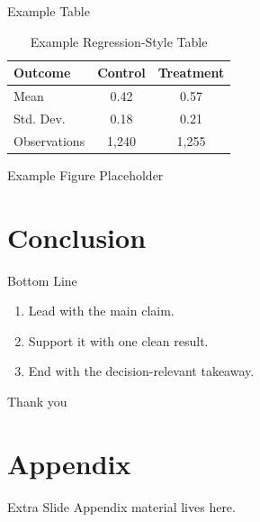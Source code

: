 \documentclass[10pt,aspectratio=169]{beamer}
\begin{document}
\begin{frame}{Example Table}
  \begin{table}
    \caption{Example Regression-Style Table}
    \begin{fittable}
      \begin{tabular}{lcc}
        \toprule
        Outcome & Control & Treatment \\
        \midrule
        Mean & 0.42 & 0.57 \\
        Std. Dev. & 0.18 & 0.21 \\
        Observations & 1{,}240 & 1{,}255 \\
        \bottomrule
      \end{tabular}
    \end{fittable}
  \end{table}

\end{frame}

\begin{frame}{Example Figure Placeholder}
  \centering
\end{frame}

\section{Conclusion}

\begin{frame}{Bottom Line}
  \begin{enumerate}\tightlist
    \item Lead with the main claim.
    \item Support it with one clean result.
    \item End with the decision-relevant takeaway.
  \end{enumerate}
\end{frame}

\begin{frame}[standout]
  Thank you
\end{frame}

\appendix
\backupbegin

\section{Appendix}

\begin{frame}{Extra Slide}
  Appendix material lives here.
\end{frame}

\backupend
\end{document}
